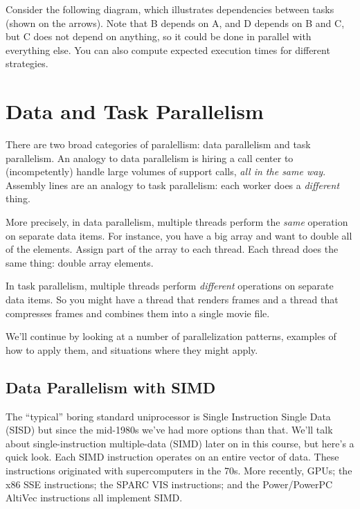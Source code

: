 \documentclass[a4paper]{report}
\begin{document}
Consider the following diagram, which illustrates dependencies between
tasks (shown on the arrows). 
Note that B depends on A, and D depends on B and C, but C does
not depend on anything, so it could be done in parallel with
everything else. You can also compute expected execution times
for different strategies.
\begin{center}
\end{center}

\section*{Data and Task Parallelism}
There are two broad categories of paralellism: data parallelism and
task parallelism. An analogy to data parallelism is hiring a call
center to (incompetently) handle large volumes of support calls,
\emph{all in the same way}. Assembly lines are an analogy to task
parallelism: each worker does a \emph{different} thing.

More precisely, in data parallelism, multiple threads perform the
\emph{same} operation on separate data items. For instance, you have a
big array and want to double all of the elements. Assign part of the
array to each thread. Each thread does the same thing: double array
elements.

In task parallelism, multiple threads perform \emph{different}
operations on separate data items. So you might have a thread that
renders frames and a thread that compresses frames and combines them
into a single movie file.

We'll continue by looking at a number of parallelization patterns,
examples of how to apply them, and situations where they might apply.

\subsection*{Data Parallelism with SIMD}
The ``typical'' boring standard uniprocessor is Single Instruction Single Data (SISD) but since the mid-1980s we've had more options than that. We'll talk about single-instruction multiple-data (SIMD) later on in
this course, but here's a quick look. Each SIMD
instruction operates on an entire vector of data. These instructions
originated with supercomputers in the 70s. More recently, GPUs; the
x86 SSE instructions; the SPARC VIS instructions; and the
Power/PowerPC AltiVec instructions all implement SIMD.
\end{document}
